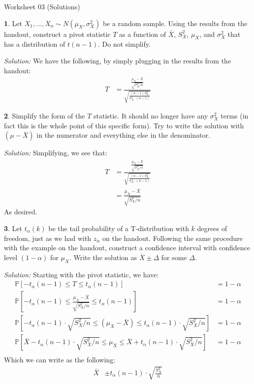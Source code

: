 \documentclass{tufte-handout}
\newcommand{\Prob}{\mathbb{P}}
\begin{document}
\justify

{\LARGE Worksheet 03 (Solutions)}

\vspace*{18pt}


\textbf{1}. Let $X_1, \ldots, X_n \sim N(\mu_X, \sigma_X^2)$ be a random sample. Using
the results from the handout, construct a pivot statistic $T$ as a function
of $\bar{X}$, $S_X^2$, $\mu_X$, and $\sigma_X^2$ that has a distribution of
$t(n-1)$. Do not simplify.

\textit{Solution:} We have the following, by simply plugging in the results from the handout:
\begin{align*}
T &= \frac{\frac{\mu_X - \bar{X}}{\sqrt{\sigma_X^2 / n}}}{\sqrt{\frac{(n-1)S^2_X}{\sigma_X^2 \cdot (n-1)}}}
\end{align*}

\textbf{2}. Simplify the form of the $T$ statistic. It should no longer have any
$\sigma_X^2$ terms (in fact this is the whole point of this specific form). 
Try to write the solution with $(\mu - \bar{X})$ in the numerator and
everything else in the denominator.

\textit{Solution:} Simplifying, we see that:
\begin{align*}
T &= \frac{\frac{\mu_X - \bar{X}}{\sqrt{\sigma_X^2 / n}}}{\sqrt{\frac{(n-1)S^2_X}{\sigma_X^2 \cdot (n-1)}}} \\
&= \frac{\mu_X - \bar{X}}{\sqrt{S^2_X / n}}
\end{align*}
As desired.

\textbf{3}. Let $t_\alpha(k)$ be the tail probability of a T-distribution with $k$
degrees of freedom, just as we had with $z_\alpha$ on the handout. Following
the same procedure with the example on the handout, construct a confidence
interval with confidence level $(1 - \alpha)$ for $\mu_X$. Write the solution
as $\bar{X} \pm \Delta$ for some $\Delta$.

\textit{Solution:} Starting with the pivot statistic, we have:
\begin{align*}
\Prob\left[ -t_\alpha(n-1) \leq T \leq t_\alpha(n-1) \right] &= 1 - \alpha \\
\Prob\left[ -t_\alpha(n-1) \leq \frac{\mu_X - \bar{X}}{\sqrt{S^2_X / n}} \leq t_\alpha(n-1) \right] &= 1 - \alpha \\
\Prob\left[ -t_\alpha(n-1) \cdot \sqrt{S^2_X / n} \leq (\mu_X - \bar{X}) \leq t_\alpha(n-1) \cdot \sqrt{S^2_X / n} \right] &= 1 - \alpha \\
\Prob\left[ \bar{X} - t_\alpha(n-1) \cdot \sqrt{S^2_X / n} \leq \mu_X \leq \bar{X} + t_\alpha(n-1) \cdot \sqrt{S^2_X / n} \right] &= 1 - \alpha \\
\end{align*}
Which we can write as the following:
\begin{align*}
\bar{X} &\pm t_\alpha(n-1) \cdot \sqrt{\frac{S^2_X}{n}}
\end{align*}
\end{document}
